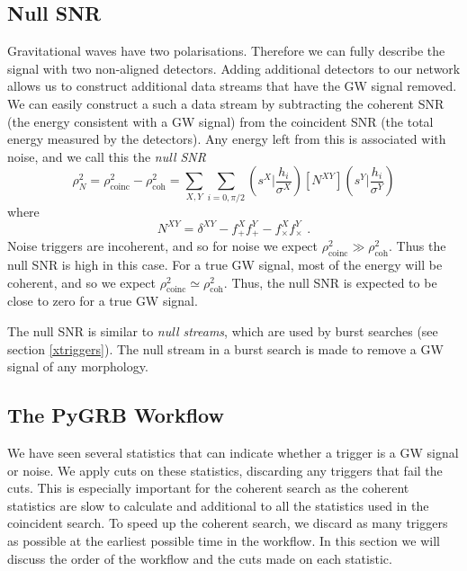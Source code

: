 \documentclass[11pt]{cuthesis}
\newcommand{\fs}{\text{ .}}
\begin{document}
\subsection{Null SNR} \label{sec:null snr}
Gravitational waves have two polarisations. Therefore we can fully describe the signal with two non-aligned detectors. Adding additional detectors to our network allows us to construct additional data streams that have the GW signal removed. We can easily construct a such a data stream by subtracting the coherent SNR (the energy consistent with a GW signal) from the coincident SNR (the total energy measured by the detectors). Any energy left from this is associated with noise, and we call this the \textit{null SNR}
\begin{equation} \label{null snr}
\rho_N^2 = \rho_\text{coinc}^2 - \rho_\text{coh}^2 = \sum_{X,Y} \sum_{i=0,\pi/2} \left( s^X \bigg| \frac{h_i}{\sigma^X} \right) [N^{XY}]  \left( s^Y \bigg| \frac{h_i}{\sigma^Y} \right)
\end{equation} 
where
\begin{equation}
N^{XY} = \delta^{XY} - f^X_{+}f^Y_{+} - f^X_{\times}f^Y_{\times} \fs
\end{equation}
Noise triggers are incoherent, and so for noise we expect $\rho_\text{coinc}^2\gg\rho_\text{coh}^2$. Thus the null SNR is high in this case. For a true GW signal, most of the energy will be coherent, and so we expect $\rho_\text{coinc}^2 \simeq \rho_\text{coh}^2$.  Thus, the null SNR is expected to be close to zero for a true GW signal. 

The null SNR is similar to \textit{null streams}, which are used by burst searches (see section \ref{xtriggers}). The null stream in a burst search is made to remove a GW signal of any morphology. 


\subsection{The PyGRB Workflow} \label{sec:thresholds}
We have seen several statistics that can indicate whether a trigger is a GW signal or noise. We apply cuts on these statistics, discarding any triggers that fail the cuts. This is especially important for the coherent search as the coherent statistics are slow to calculate and additional to all the statistics used in the coincident search. To speed up the coherent search, we discard as many triggers as possible at the earliest possible time in the workflow. In this section we will discuss the order of the workflow and the cuts made on each statistic. 
\end{document}
